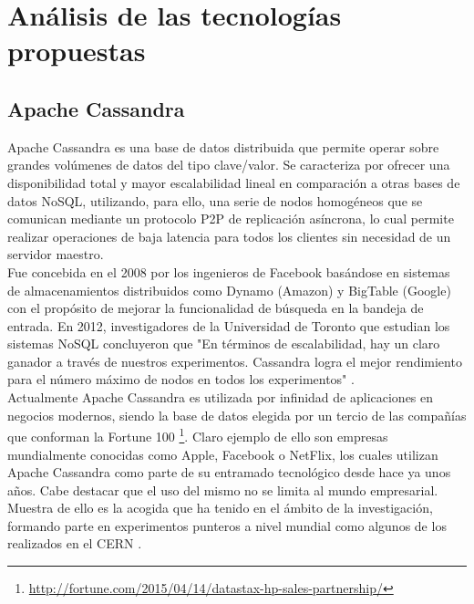 
\pagestyle{fancy}

\chapter{Análisis de las tecnologías propuestas}
\label{analisis_tecnologias}

\section{Apache Cassandra}

Apache Cassandra es una base de datos distribuida que permite operar sobre grandes volúmenes de datos del tipo clave/valor. Se caracteriza por ofrecer una  disponibilidad total y mayor escalabilidad lineal en comparación a otras bases de datos NoSQL, utilizando, para ello, una serie de nodos homogéneos que se comunican mediante un protocolo P2P de replicación asíncrona, lo cual permite realizar operaciones de baja latencia para todos los clientes sin necesidad de un servidor maestro.\\

Fue concebida en el 2008 por los ingenieros de Facebook basándose en sistemas de almacenamientos distribuidos como Dynamo (Amazon) \cite{decandia2007dynamo} y BigTable (Google) \cite{chang2008bigtable} con el propósito de mejorar la funcionalidad de búsqueda en la bandeja de entrada. En 2012, investigadores de la Universidad de Toronto que estudian los sistemas NoSQL concluyeron que "En términos de escalabilidad, hay un claro ganador a través de nuestros experimentos. Cassandra logra el mejor rendimiento para el número máximo de nodos en todos los experimentos" \cite{rabl2012solving}.\\

Actualmente Apache Cassandra es utilizada por infinidad de aplicaciones en negocios modernos, siendo la base de datos elegida por un tercio de las compañías que conforman la Fortune 100 \footnote{\url{http://fortune.com/2015/04/14/datastax-hp-sales-partnership/}}. Claro ejemplo de ello son empresas mundialmente conocidas como Apple, Facebook o NetFlix, los cuales utilizan Apache Cassandra como parte de su entramado tecnológico desde hace ya unos años. Cabe destacar que el uso del mismo no se limita al mundo empresarial. Muestra de ello es la acogida que ha tenido en el ámbito de la investigación, formando parte en experimentos punteros a nivel mundial como algunos de los realizados en el CERN \cite{sicoe2012persistent}.\\

